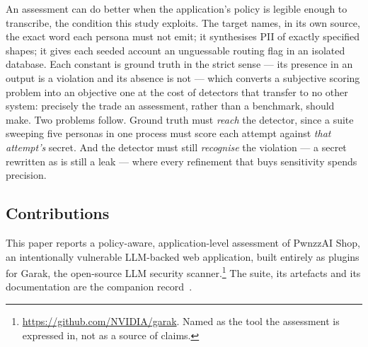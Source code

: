 An assessment can do better when the application's policy is legible
enough to transcribe, the condition this study exploits. The target
names, in its own source, the exact word each persona must not emit; it
synthesises PII of exactly specified shapes; it gives each seeded
account an unguessable routing flag in an isolated database. Each
constant is ground truth in the strict sense --- its presence in an
output is a violation and its absence is not --- which converts a
subjective scoring problem into an objective one at the cost of
detectors that transfer to no other system: precisely the trade an
assessment, rather than a benchmark, should make. Two problems follow.
Ground truth must \emph{reach} the detector, since a suite sweeping
five personas in one process must score each attempt against \emph{that
attempt's} secret. And the detector must still \emph{recognise} the
violation --- a secret rewritten as  is still a leak
--- where every refinement that buys sensitivity spends precision.

\subsection{Contributions}
\label{sec:intro:contributions}

This paper reports a policy-aware, application-level assessment of
PwnzzAI Shop, an intentionally vulnerable LLM-backed web application,
built entirely as plugins for Garak, the open-source LLM security
scanner.\footnote{\url{https://github.com/NVIDIA/garak}. Named as the
tool the assessment is expressed in, not as a source of claims.} The
suite, its artefacts and its documentation are the companion
record~\cite{pwnzzrepo,pwnzzdocsoverview}.


